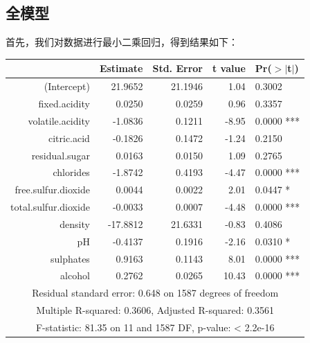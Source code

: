 \documentclass[fontset=ubuntu]{ctexart}
\begin{document}
        \subsection{全模型}
            首先，我们对数据进行最小二乘回归，得到结果如下：
            \begin{table}[ht]
                \centering
                \begin{tabular}{rrrrl}
                    \hline
                    & Estimate & Std. Error & t value & Pr($>$$|$t$|$) \\ 
                    \hline
                    (Intercept) & 21.9652 & 21.1946 & 1.04 & 0.3002 \\ 
                    fixed.acidity & 0.0250 & 0.0259 & 0.96 & 0.3357 \\ 
                    volatile.acidity & -1.0836 & 0.1211 & -8.95 & 0.0000 *** \\ 
                    citric.acid & -0.1826 & 0.1472 & -1.24 & 0.2150 \\ 
                    residual.sugar & 0.0163 & 0.0150 & 1.09 & 0.2765 \\ 
                    chlorides & -1.8742 & 0.4193 & -4.47 & 0.0000 *** \\ 
                    free.sulfur.dioxide & 0.0044 & 0.0022 & 2.01 & 0.0447 * \\ 
                    total.sulfur.dioxide & -0.0033 & 0.0007 & -4.48 & 0.0000 ***\\ 
                    density & -17.8812 & 21.6331 & -0.83 & 0.4086 \\ 
                    pH & -0.4137 & 0.1916 & -2.16 & 0.0310 * \\ 
                    sulphates & 0.9163 & 0.1143 & 8.01 & 0.0000 ***\\ 
                    alcohol & 0.2762 & 0.0265 & 10.43 & 0.0000 ***\\ 
                    \hline
                    \multicolumn{5}{c}{Residual standard error: 0.648 on 1587 degrees of freedom} \\
                    \multicolumn{5}{c}{Multiple R-squared:  0.3606,	Adjusted R-squared:  0.3561} \\
                    \multicolumn{5}{c}{F-statistic: 81.35 on 11 and 1587 DF,  p-value: < 2.2e-16} \\
                    \hline
                \end{tabular}
            \end{table}
            
\end{document}
